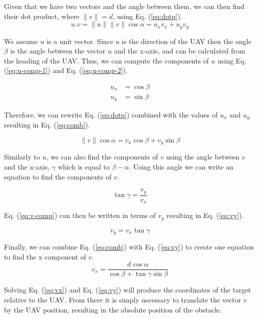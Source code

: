 Given that we have two vectors and the angle between them, we can then find their dot product, where
$\parallel v \parallel = d$, using Eq. (\ref{eq:dotp}).
\begin{equation}
	u . v = \parallel u \parallel \parallel v \parallel \cos \alpha = u_x v_x + u_y v_y
	\label{eq:dotp}
\end{equation}

We assume $u$ is a unit vector. Since $u$ is the direction of the UAV then the angle $\beta$ is the angle between the vector $u$
and the x-axis, and can be calculated from the heading of the UAV. Thus, we can compute the components of $u$ using Eq. 
(\ref{eq:u-comp-1}) and Eq. (\ref{eq:u-comp-2}). 

\begin{align}
	u_x &= \cos \beta
	\label{eq:u-comp-1} \\
	u_y &= \sin \beta
	\label{eq:u-comp-2}
\end{align}

Therefore, we can rewrite Eq. (\ref{eq:dotp}) combined with the values of $u_x$ and $u_y$ resulting in Eq. (\ref{eq:comb}). 

\begin{equation}
	\parallel v \parallel \cos \alpha =  v_x \cos \beta +  v_y \sin \beta
	\label{eq:comb}
\end{equation}

Similarly to $u$, we can also find the components of $v$ using the angle between $v$ and the x-axis, $\gamma$ which
is equal to $\beta - \alpha$. Using this angle we can write an equation to find the components of $v$. 

\begin{equation}
	\tan \gamma = \frac{v_y}{v_x}
	\label{eq:v-comp}
\end{equation}

Eq. (\ref{eq:v-comp}) can then be written in terms of $v_y$ resulting in Eq. (\ref{eq:vy}). 

\begin{equation}
	v_y = v_x \tan \gamma
	\label{eq:vy}
\end{equation}

Finally, we can combine Eq. (\ref{eq:comb}) with Eq. (\ref{eq:vy}) to create one equation to find the x component of $v$. 
\begin{equation}
	v_x = \frac{d \cos \alpha}{\cos \beta + \tan \gamma \sin \beta}
	\label{eq:vx}
\end{equation}

Solving Eq. (\ref{eq:vx}) and Eq. (\ref{eq:vy}) will produce the coordinates of the target relative to the UAV. 
From there it is simply necessary to translate the vector $v$ by the UAV position, resulting in the 
absolute position of the obstacle.

